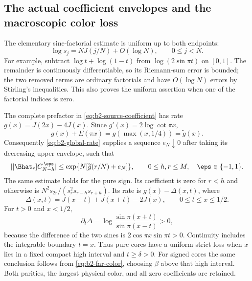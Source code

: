 \subsection{The actual coefficient envelopes and the macroscopic color loss}

The elementary sine-factorial estimate is uniform up to both endpoints:
\begin{equation}\label{eq:b2-factorial-endpoints}
 \log s_j=NJ(j/N)+O(\log N),\qquad 0\le j<N.
\end{equation}
For example, subtract $\log t+\log(1-t)$ from
$\log(2\sin\pi t)$ on $[0,1]$. The remainder is continuously
differentiable, so its Riemann-sum error is bounded; the two removed
terms are ordinary factorials and have $O(\log N)$ errors by
Stirling's inequalities. This also proves the uniform assertion
when one of the factorial indices is zero.

The complete prefactor in \eqref{eq:b2-source-coefficient} has rate
$g(x)=J(2x)-4J(x)$. Since $g'(x)=2\log\cot\pi x$,
\begin{equation}\label{eq:b2-g-plus-E}
 g(x)+E(\pi x)=g(\max(x,1/4))=\widetilde g(x).
\end{equation}
Consequently \eqref{eq:b2-global-rate} supplies a sequence
$e_N\downarrow0$ after taking its decreasing upper envelope, such that
\[
 |[\Bhat_r]C_{N-h}^{\,\eps}|
 \le \exp\{N[\widetilde g(r/N)+e_N]\},
 \qquad 0\le h,r\le M,\quad\eps\in\{-1,1\}.
\]
The same estimate holds for the pure sign. Its coefficient is zero
for $r<h$ and otherwise is
$N^2s_{2r}/(s_r^2s_{r-h}s_{r+h})$. Its rate is
$g(x)-\Delta(x,t)$, where
\[
 \Delta(x,t)=J(x-t)+J(x+t)-2J(x),\qquad 0\le t\le x\le1/2.
\]
For $t>0$ and $x<1/2$,
\[
 \partial_t\Delta
  =\log\frac{\sin\pi(x+t)}{\sin\pi(x-t)}>0,
\]
because the difference of the two sines is
$2\cos\pi x\sin\pi t>0$. Continuity includes the integrable
boundary $t=x$. Thus pure cores have a uniform strict loss when
$x$ lies in a fixed compact high interval and $t\ge\delta>0$.
For signed cores the same conclusion follows from
\eqref{eq:b2-far-color}, choosing $\beta$ above that high interval.
Both parities, the largest physical color, and all zero coefficients
are retained.

